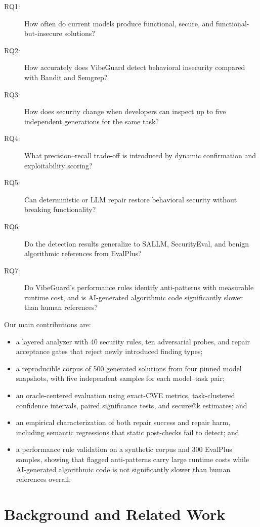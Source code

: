 \documentclass[sigconf,nonacm]{acmart}
\begin{document}
\begin{description}
  \item[RQ1:] How often do current models produce functional, secure, and
  functional-but-insecure solutions?
  \item[RQ2:] How accurately does VibeGuard detect behavioral insecurity
  compared with Bandit and Semgrep?
  \item[RQ3:] How does security change when developers can inspect up to five
  independent generations for the same task?
  \item[RQ4:] What precision--recall trade-off is introduced by dynamic
  confirmation and exploitability scoring?
  \item[RQ5:] Can deterministic or LLM repair restore behavioral security
  without breaking functionality?
  \item[RQ6:] Do the detection results generalize to SALLM, SecurityEval, and
  benign algorithmic references from EvalPlus?
  \item[RQ7:] Do VibeGuard's performance rules identify anti-patterns with
  measurable runtime cost, and is AI-generated algorithmic code significantly
  slower than human references?
\end{description}

Our main contributions are:
\begin{itemize}
  \item a layered analyzer with 40 security rules, ten adversarial probes, and
  repair acceptance gates that reject newly introduced finding types;
  \item a reproducible corpus of 500 generated solutions from four pinned model
  snapshots, with five independent samples for each model--task pair;
  \item an oracle-centered evaluation using exact-CWE metrics, task-clustered
  confidence intervals, paired significance tests, and secure@k estimates; and
  \item an empirical characterization of both repair success and repair harm,
  including semantic regressions that static post-checks fail to detect; and
  \item a performance rule validation on a synthetic corpus and 300 EvalPlus
  samples, showing that flagged anti-patterns carry large runtime costs while
  AI-generated algorithmic code is not significantly slower than human
  references overall.
\end{itemize}

\section{Background and Related Work}
\end{document}
